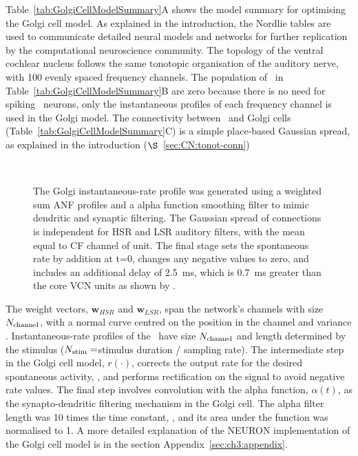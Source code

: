 
Table~\ref{tab:GolgiCellModelSummary}A shows the model summary for optimising the Golgi cell model.
As explained in the introduction, the Nordlie tables are used to communicate detailed neural models and networks for further replication by the computational neuroscience community.
The topology of the ventral cochlear nucleus follows the same tonotopic organisation of the auditory nerve, with 100 evenly spaced frequency channels.
The population of \ANFs~in Table~\ref{tab:GolgiCellModelSummary}B are zero because there is no need for spiking \ANF~neurons, only the instantaneous profiles of each frequency channel is used in the Golgi model.
 The connectivity between \ANFs~and Golgi cells (Table~\ref{tab:GolgiCellModelSummary}C) is a simple place-based Gaussian spread, as explained in the introduction ($\S$~\ref{sec:CN:tonot-conn})

% 


\begin{figure}[htb]
  \centering
\resizebox{0.9\textwidth}{!}{}\\
  \caption[Golgi cell model diagram]{The Golgi instantaneous-rate profile was generated using a weighted sum ANF profiles and a alpha function smoothing filter to mimic dendritic and synaptic filtering.
The Gaussian spread of connections is independent for HSR and LSR auditory filters, with the mean equal to CF channel of unit.
The final stage sets the spontaneous rate by addition at t=0, changes any negative values to zero, and includes an additional delay of 2.5~ms, which is 0.7~ms greater than the core VCN units as shown by \citet{GhoshalKim:1997}.}
  \label{fig:GolgiDiagram}
 \end{figure}


The weight vectors, $\mathbf{w}_{HSR}$ and $\mathbf{w}_{LSR}$, span the network's channels with size $N_{\rm channel}$, with a normal curve centred on the position in the channel and variance \sANFGLG\@.
Instantaneous-rate profiles of the \AN~have size $N_{\rm channel}$ and length determined by the stimulus ($N_{\rm stim}=$stimulus duration / sampling rate).
The intermediate step in the Golgi cell model, $r(\cdot)$, corrects the output rate for the desired spontaneous activity, \Gspon, and performs rectification on the signal to avoid negative rate values.
The final step involves convolution with the alpha function, $\alpha(t)$, as the synapto-dendritic filtering mechanism in the Golgi cell.
The alpha filter length was 10 times the time constant, \Gtau, and its area under the function was normalised to 1.
A more detailed explanation of the NEURON implementation of the Golgi cell model is in the section Appendix~\ref{sec:ch3:appendix}.

